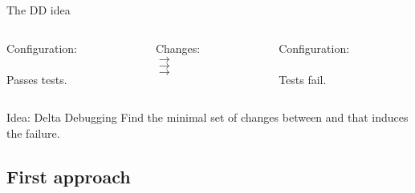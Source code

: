 \begin{frame}{The DD idea}
	\begin{columns}
		\begin{column}{0.4\textwidth}
			\begin{center}
			Configuration:\\[2em]

			\yd\\[1em]
			Passes tests. \green{\cmark}
			\end{center}
		\end{column}
		\begin{column}{0.2\textwidth}
			\begin{center}
			Changes:\\[1.5em]
			$\longrightarrow$ \\
			$\longrightarrow$ \\
			$\longrightarrow$ \\
			\end{center}
			
		\end{column}
		\begin{column}{0.4\textwidth}
			\begin{center}	
			Configuration:\\[2em]

			\td\\[1em]
			Tests fail. \red{\xmark}
			\end{center}
		\end{column}
	\end{columns}

	\bigskip

	\begin{exampleblock}{Idea: Delta Debugging}
		Find the minimal set of changes between \yd and \td that induces the failure.
	\end{exampleblock}
\end{frame}

\subsection{First approach}

